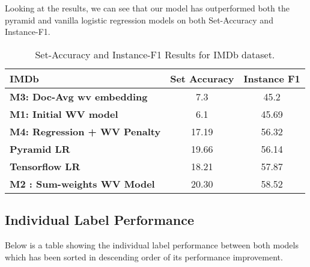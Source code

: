 Looking at the results, we can see that our model has outperformed both the pyramid and vanilla logistic regression models on both Set-Accuracy and Instance-F1.

\begin{table}[htbp]
\centering
\begin{tabular}{l|c|c}
IMDb & \textbf{Set Accuracy} & \textbf{Instance F1} \\ \hline
\textbf{M3: Doc-Avg wv embedding} & 7.3 & 45.2 \\
\textbf{M1: Initial WV model} & 6.1 & 45.69 \\
\textbf{M4: Regression + WV Penalty} & 17.19 & 56.32 \\
\textbf{Pyramid LR} & 19.66 & 56.14 \\
\textbf{Tensorflow LR} & 18.21 & 57.87 \\
\textbf{M2 : Sum-weights WV Model} & 20.30 & 58.52
\end{tabular}
\caption{\label{tab:widgets}Set-Accuracy and Instance-F1 Results for IMDb dataset.}
\end{table}

\newpage
\subsection{Individual Label Performance}

Below is a table showing the individual label performance between both models which has been sorted in descending order of its performance improvement.\\


